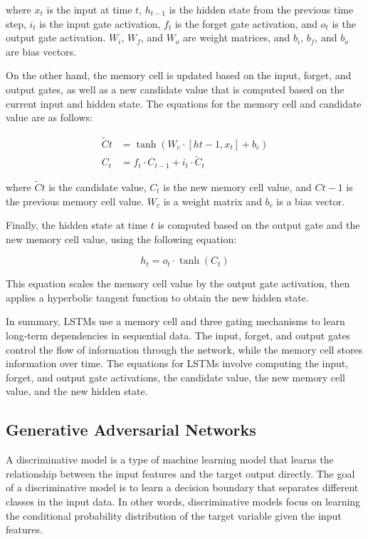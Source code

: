 where $x_t$ is the input at time $t$, $h_{t-1}$ is the hidden state from the previous time step, $i_t$ is the input gate activation, $f_t$ is the forget gate activation, and $o_t$ is the output gate activation. $W_i$, $W_f$, and $W_o$ are weight matrices, and $b_i$, $b_f$, and $b_o$ are bias vectors.

On the other hand, the memory cell is updated based on the input, forget, and output gates, as well as a new candidate value that is computed based on the current input and hidden state. The equations for the memory cell and candidate value are as follows:

\begin{equation}
\begin{split}
		\tilde{C}t &= \tanh(W_c \cdot [h{t-1}, x_t] + b_c) \\
		C_t &= f_t \cdot C_{t-1} + i_t \cdot \tilde{C}_t 
\end{split}
\end{equation}

where $\tilde{C}t$ is the candidate value, $C_t$ is the new memory cell value, and $C{t-1}$ is the previous memory cell value. $W_c$ is a weight matrix and $b_c$ is a bias vector.

Finally, the hidden state at time $t$ is computed based on the output gate and the new memory cell value, using the following equation:

\begin{equation}
	h_t = o_t \cdot \tanh(C_t)
\end{equation}

This equation scales the memory cell value by the output gate activation, then applies a hyperbolic tangent function to obtain the new hidden state.

In summary, LSTMs use a memory cell and three gating mechanisms to learn long-term dependencies in sequential data. The input, forget, and output gates control the flow of information through the network, while the memory cell stores information over time. The equations for LSTMs involve computing the input, forget, and output gate activations, the candidate value, the new memory cell value, and the new hidden state.

\subsection{Generative Adversarial Networks}
\label{subsec:3_gans}

A discriminative model is a type of machine learning model that learns the relationship between the input features and the target output directly. The goal of a discriminative model is to learn a decision boundary that separates different classes in the input data. In other words, discriminative models focus on learning the conditional probability distribution of the target variable given the input features.

